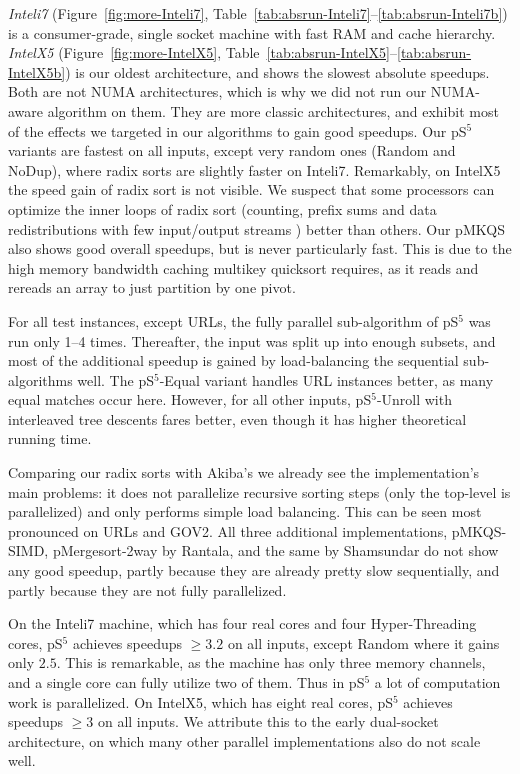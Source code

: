 \documentclass[a4paper]{myjournal}
\begin{document}
\emph{Inteli7} (Figure~\ref{fig:more-Inteli7}, Table~\ref{tab:absrun-Inteli7}--\ref{tab:absrun-Inteli7b}) is a consumer-grade, single
socket machine with fast RAM and cache hierarchy. \emph{IntelX5}
(Figure~\ref{fig:more-IntelX5}, Table~\ref{tab:absrun-IntelX5}--\ref{tab:absrun-IntelX5b}) is our oldest architecture, and shows the
slowest absolute speedups. Both are not NUMA architectures, which is why we did
not run our NUMA-aware algorithm on them. They are more classic architectures,
and exhibit most of the effects we targeted in our algorithms to gain good
speedups. Our pS$^5$ variants are fastest on all inputs, except very random ones
(Random and NoDup), where radix sorts are slightly faster on Inteli7.
Remarkably, on IntelX5 the speed gain of radix sort is not visible.  We suspect
that some processors can optimize the inner loops of radix sort (counting,
prefix sums and data redistributions with few input/output streams
\cite{karkkainen2009engineering}) better than others.  Our pMKQS also shows good
overall speedups, but is never particularly fast.  This is due to the high
memory bandwidth caching multikey quicksort requires, as it reads and rereads an
array to just partition by one pivot.

For all test instances, except URLs, the fully parallel sub-algorithm of pS$^5$
was run only 1--4 times. Thereafter, the input was split up into enough subsets,
and most of the additional speedup is gained by load-balancing the sequential
sub-algorithms well. The pS$^5$-Equal variant handles URL instances better, as
many equal matches occur here. However, for all other inputs, pS$^5$-Unroll with
interleaved tree descents fares better, even though it has higher theoretical
running time.

Comparing our radix sorts with Akiba's we already see the implementation's main
problems: it does not parallelize recursive sorting steps (only the top-level is
parallelized) and only performs simple load balancing. This can be seen most
pronounced on URLs and GOV2.  All three additional implementations, pMKQS-SIMD,
pMergesort-2way by Rantala, and the same by Shamsundar do not show any good
speedup, partly because they are already pretty slow sequentially, and partly
because they are not fully parallelized.

On the Inteli7 machine, which has four real cores and four Hyper-Threading
cores, pS$^5$ achieves speedups $\geq 3.2$ on all inputs, except Random where it
gains only $2.5$. This is remarkable, as the machine has only three memory
channels, and a single core can fully utilize two of them. Thus in pS$^5$ a lot
of computation work is parallelized. On IntelX5, which has eight real cores,
pS$^5$ achieves speedups $\geq 3$ on all inputs. We attribute this to the early
dual-socket architecture, on which many other parallel implementations also do
not scale well.
\end{document}
